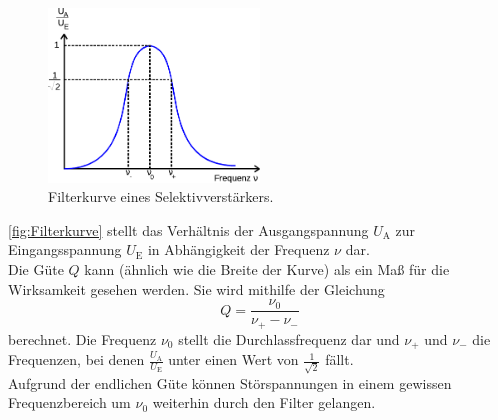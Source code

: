     \begin{figure}
      \centering
      \includegraphics[width=0.5\textwidth]{content/img/Abb_3.pdf}
      \caption{Filterkurve eines Selektivverstärkers. \cite{versuchsanleitung}}
      \label{fig:Filterkurve}
    \end{figure}

    \autoref{fig:Filterkurve} stellt das Verhältnis der Ausgangspannung $U_\text{A}$ zur Eingangsspannung $U_\text{E}$ in Abhängigkeit der Frequenz $\nu$ dar.\\
    Die Güte $Q$ kann (ähnlich wie die Breite der Kurve) als ein Maß für die Wirksamkeit gesehen werden.
    Sie wird mithilfe der Gleichung
    \begin{equation}
        \label{eqn:güte}
        Q = \frac{\nu_0}{\nu_+ - \nu_-}
    \end{equation}
    berechnet.
    Die Frequenz $\nu_0$ stellt die Durchlassfrequenz dar
    und $\nu_+$ und $\nu_-$ die Frequenzen,
    bei denen $\frac{U_\text{A}}{U_\text{E}}$ unter einen Wert von $\frac{1}{\sqrt{2}}$ fällt.\\
    Aufgrund der endlichen Güte können Störspannungen in einem gewissen Frequenzbereich um $\nu_0$ weiterhin durch den Filter gelangen.
